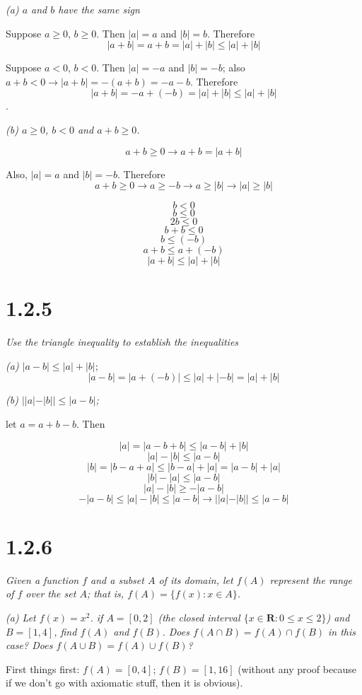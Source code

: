 \documentclass[11pt,oneside,titlepage]{article}
\begin{document}
\textit{(a) $a$ and $b$ have the same sign}

Suppose $a \geq 0$, $b \geq 0$. Then $|a| = a$ and $|b| = b$. Therefore
$$|a + b| = a + b = |a| + |b| \leq  |a| + |b|$$

Suppose $a < 0$, $b < 0$. Then $|a| = -a$ and $|b| = -b$; also $a + b < 0 \to
|a + b| = -(a + b) = -a - b$. Therefore 
$$|a + b| = -a + (-b) = |a| + |b| \leq  |a| + |b|$$.

\textit{(b) $a \geq 0$, $b < 0$ and $a + b \geq 0$.}

$$a + b \geq 0 \to a + b = |a + b|$$

Also, $|a| = a$ and $|b| = -b$. Therefore
$$a + b \geq 0 \to a \geq -b \to a \geq |b| \to |a| \geq |b|$$

$$ b < 0$$
$$ b \leq 0$$
$$ 2b \leq 0$$
$$ b + b \leq 0$$
$$ b \leq (-b)$$
$$a + b \leq a + (-b)$$
$$|a + b| \leq |a| + |b|$$

\section*{1.2.5}
\textit{Use the triangle inequality to establish the inequalities}

\textit{(a) $|a - b| \leq |a| + |b|;$}
$$|a - b| = |a + (-b)| \leq |a| + |-b| = |a| + |b|$$

\textit{(b) $||a| - |b|| \leq |a - b|$;}

let $a = a + b - b$. Then

$$|a| = |a - b + b| \leq |a - b| + |b|$$
$$|a| - |b| \leq |a - b|$$
$$|b| = |b - a + a| \leq |b - a| + |a| = |a - b| + |a|$$
$$|b| - |a| \leq |a - b|$$
$$|a| - |b| \geq -|a - b|$$
$$-|a - b| \leq |a| - |b| \leq |a - b| \to ||a| - |b|| \leq |a - b|$$

\section*{1.2.6}
\textit{Given a function $f$ and a subset $A$ of its domain, let $f(A)$
  represent the range of $f$ over the set $A$; that is,
  $f(A) = \{f(x): x \in A\}$. }

\textit{(a) Let $f(x) = x^2$. if $A=[0,2]$ (the closed interval $\{x \in
  \textbf{R}: 0 \leq x \leq 2\}$) and $B=[1,4]$, find $f(A)$ and $f(B)$. Does
  $f (A \cap B) = f(A) \cap f(B)$ in this case? Does $f(A \cup B) = f(A) \cup
  f(B)$? }

First things first: $f(A) = [0, 4]$; $f(B) = [1, 16]$ (without any proof
because if we don't go with axiomatic stuff, then it is obvious).
\end{document}
